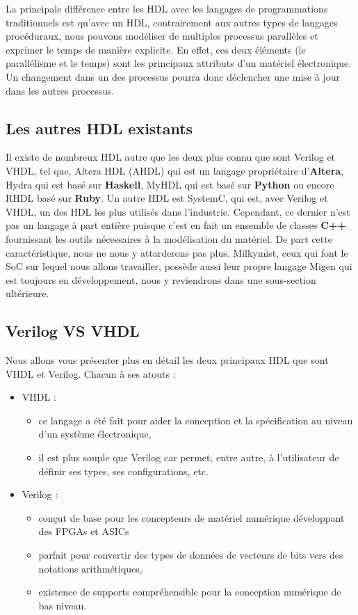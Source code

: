 La principale différence entre les HDL avec les langages de programmations traditionnels est qu'avec un HDL, contrairement aux autres types de langages procéduraux, nous pouvons modéliser de multiples processus parallèles et exprimer le temps de manière explicite. En effet, ces deux éléments (le parallélisme et le temps) sont les principaux attributs d'un matériel électronique. Un changement dans un des processus pourra donc déclencher une mise à jour dans les autres processus.

\subsection{Les autres HDL existants}
Il existe de nombreux HDL autre que les deux plus connu que sont Verilog et VHDL, tel que, Altera HDL (AHDL) qui est un langage propriétaire d'\textbf{Altera}, Hydra qui est basé sur \textbf{Haskell}, MyHDL qui est basé sur \textbf{Python} ou encore RHDL basé sur \textbf{Ruby}. Un autre HDL est SystemC, qui est, avec Verilog et VHDL, un des HDL les plus utilisés dans l'industrie. Cependant, ce dernier n'est pas un langage à part entière puisque c'est en fait un ensemble de classes \textbf{C++} fournissant les outils nécessaires à la modélisation du matériel. De part cette caractéristique, nous ne nous y attarderons pas plus. Milkymist, ceux qui font le SoC sur lequel nous allons travailler, possède aussi leur propre langage Migen qui est toujours en développement, nous y reviendrons dans une sous-section ultérieure.

\subsection{Verilog VS VHDL}
\vspace{15px}
Nous allons vous présenter plus en détail les deux principaux HDL que sont VHDL et Verilog. Chacun à ses atouts :
\begin{itemize}
\item VHDL :
\begin{itemize}
\item ce langage a été fait pour aider la conception et la spécification au niveau d'un système électronique,
\item il est plus souple que Verilog car permet, entre autre, à l'utilisateur de définir ses types, ses configurations, etc.
\end{itemize}
\item Verilog :
\begin{itemize}
\item conçut de base pour les concepteurs de matériel numérique développant des FPGAs et ASICs
\item parfait pour convertir des types de données de vecteurs de bits vers des notations arithmétiques,
\item existence de supports compréhensible pour la conception numérique de bas niveau.
\end{itemize}
\end{itemize}

